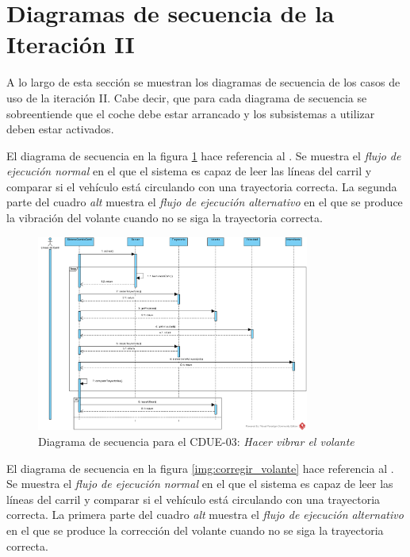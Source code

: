 \section{Diagramas de secuencia de la Iteración II}

\par A lo largo de esta sección se muestran los diagramas de secuencia de los casos de uso de la iteración II. Cabe decir, que para cada diagrama de secuencia se sobreentiende que el coche debe estar arrancado y los subsistemas a utilizar deben estar activados.

\par El diagrama de secuencia  en la figura \ref{img:vibrar_volante} hace referencia al . Se muestra el \textit{flujo de ejecución normal} en el que el sistema es capaz de leer las líneas del carril y comparar si el vehículo está circulando con una trayectoria correcta. La segunda parte del cuadro \textit{alt} muestra el \textit{flujo de ejecución alternativo} en el que se produce la vibración del volante cuando no se siga la trayectoria correcta.

\begin{figure}[H]
  \begin{center}
    \includegraphics[width=0.8\textwidth]{./img/diagramas_de_secuencia/CDUE-03.png}
  \end{center}
  \caption{Diagrama de secuencia para el CDUE-03: \textit{Hacer vibrar el volante}}
  \label{img:vibrar_volante}
\end{figure}

\par El diagrama de secuencia  en la figura \ref{img:corregir_volante} hace referencia al . Se muestra el \textit{flujo de ejecución normal} en el que el sistema es capaz de leer las líneas del carril y comparar si el vehículo está circulando con una trayectoria correcta. La primera parte del cuadro \textit{alt} muestra el \textit{flujo de ejecución alternativo} en el que se produce la corrección del volante cuando no se siga la trayectoria correcta.

